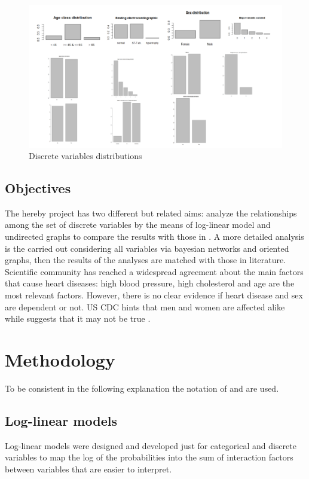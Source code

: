 \documentclass{article}
\begin{document}
\begin{figure}[H]
        \centering
       \includegraphics[width=1\textwidth]{plots.pdf}
       \caption{Discrete variables distributions}
   \end{figure}
   
\subsection{Objectives}
The hereby project has two different but related aims: analyze the relationships among the set of discrete variables by the means of log-linear model and undirected graphs to compare the results with those in \cite{Steno}. A more detailed analysis is the carried out considering all variables via bayesian networks and oriented graphs, then the results of the analyses are matched with those in literature.\\

Scientific community has reached a widespread agreement about the main factors that cause heart diseases: high blood pressure, high cholesterol and age are the most relevant factors. However, there is no clear evidence if heart disease and sex are dependent or not. US CDC hints that men and women are affected alike while suggests that it may not be true \cite{Steno} \cite{Health-related variables} \cite{CDC paper}.

\section{Methodology}
To be consistent in the following explanation the notation of \cite{book} and \cite{ArtInt} are used.

\subsection{Log-linear models}
Log-linear models were designed and developed just for categorical and discrete variables to map the log of the probabilities into the sum of interaction factors between variables that are easier to interpret.\\
\end{document}
